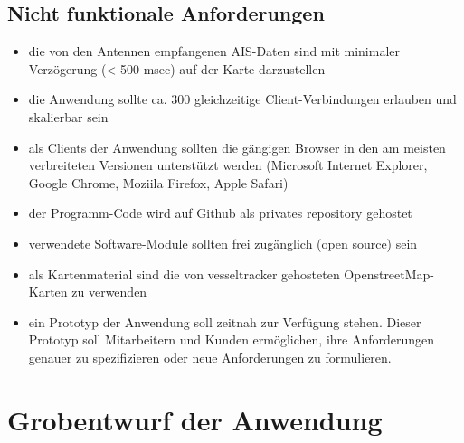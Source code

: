 \subsection{Nicht funktionale Anforderungen}\label{Nicht funktionale Anforderungen}
\begin{itemize}
\item die von den Antennen empfangenen AIS-Daten sind mit minimaler Verzögerung (< 500 msec) auf der Karte darzustellen
\item die Anwendung sollte ca. 300 gleichzeitige Client-Verbindungen erlauben und skalierbar sein
\item als Clients der Anwendung sollten die gängigen Browser in den am meisten verbreiteten Versionen unterstützt werden (Microsoft Internet Explorer, Google Chrome, Moziila Firefox, Apple Safari) 
\item der Programm-Code wird auf Github als privates repository gehostet
\item verwendete Software-Module sollten frei zugänglich (open source) sein 
\item als Kartenmaterial sind die von vesseltracker gehosteten OpenstreetMap-Karten zu verwenden
\item ein Prototyp der Anwendung soll zeitnah zur Verfügung stehen. Dieser Prototyp soll Mitarbeitern und Kunden ermöglichen, ihre Anforderungen genauer zu spezifizieren oder neue Anforderungen zu formulieren. 
\end{itemize}
\newpage
\section{Grobentwurf der Anwendung}\label{s.Grobentwurf der Anwendung}

